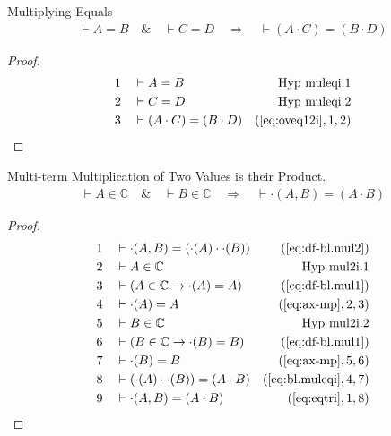 \begin{lemma} Multiplying Equals
\begin{align}
\vdash A = B\quad\&\quad \vdash C = D\quad\Rightarrow\quad \vdash ( A \cdot C )
    = ( B \cdot D )\label{eq:bl.muleqi}\tag{bl.muleqi}
\end{align}
\end{lemma}

\begin{proof}
\begin{align}
  1 &&  & \vdash A = B&\text{Hyp~muleqi.1}\notag%
  \\ 2 &&  & \vdash C = D&\text{Hyp~muleqi.2}\notag%
  \\ 3 &&  & \vdash ( A \cdot C ) = ( B \cdot D )&(\mbox{\ref{eq:oveq12i}},1,2)\notag
\end{align}
\end{proof}

\begin{lemma} Multi-term Multiplication of Two Values is
their Product.
\begin{align}
\vdash A \in \mathbb{C}\quad\&\quad \vdash B \in
    \mathbb{C}\quad\Rightarrow\quad \vdash \cdot( A , B ) = ( A \cdot B
    )\label{eq:bl.mul2i}\tag{bl.mul2i}
\end{align}
\end{lemma}

\begin{proof}
\begin{align}
  1 &&  & \vdash \cdot( A , B ) = ( \cdot( A ) \cdot \cdot( B ) )&(\mbox{\ref{eq:df-bl.mul2}})\notag
  \\ 2 &&  & \vdash A \in \mathbb{C}&\text{Hyp~mul2i.1}\notag%
  \\ 3 &&  & \vdash ( A \in \mathbb{C} \rightarrow \cdot( A ) = A )&(\mbox{\ref{eq:df-bl.mul1}})\notag
  \\ 4 &&  & \vdash \cdot( A ) = A&(\mbox{\ref{eq:ax-mp}},2,3)\notag
  \\ 5 &&  & \vdash B \in \mathbb{C}&\text{Hyp~mul2i.2}\notag%
  \\ 6 &&  & \vdash ( B \in \mathbb{C} \rightarrow \cdot( B ) = B )&(\mbox{\ref{eq:df-bl.mul1}})\notag
  \\ 7 &&  & \vdash \cdot( B ) = B&(\mbox{\ref{eq:ax-mp}},5,6)\notag
  \\ 8 &&  & \vdash ( \cdot( A ) \cdot \cdot( B ) ) = ( A \cdot B )&(\mbox{\ref{eq:bl.muleqi}},4,7)\notag
  \\ 9 &&  & \vdash \cdot( A , B ) = ( A \cdot B )&(\mbox{\ref{eq:eqtri}},1,8)\notag
\end{align}
\end{proof}

